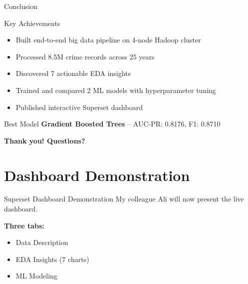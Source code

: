\documentclass[10pt]{beamer}
\begin{document}
\begin{frame}{Conclusion}
\begin{block}{Key Achievements}
\begin{itemize}
    \item Built end-to-end big data pipeline on 4-node Hadoop cluster
    \item Processed 8.5M crime records across 25 years
    \item Discovered 7 actionable EDA insights
    \item Trained and compared 2 ML models with hyperparameter tuning
    \item Published interactive Superset dashboard
\end{itemize}
\end{block}

\vspace{0.3cm}
\begin{exampleblock}{Best Model}
\textbf{Gradient Boosted Trees} -- AUC-PR: 0.8176, F1: 0.8710
\end{exampleblock}

\vspace{0.3cm}
\centering
\textbf{\large Thank you! Questions?}

\end{frame}

\section{Dashboard Demonstration}

\begin{frame}{Superset Dashboard Demonstration}
\centering
\vspace{1.5cm}
{\LARGE My colleague Ali will now present the live dashboard.}

\vspace{1cm}
\textbf{Three tabs:}
\begin{itemize}
    \item Data Description
    \item EDA Insights (7 charts)
    \item ML Modeling
\end{itemize}
\end{frame}

\end{document}
